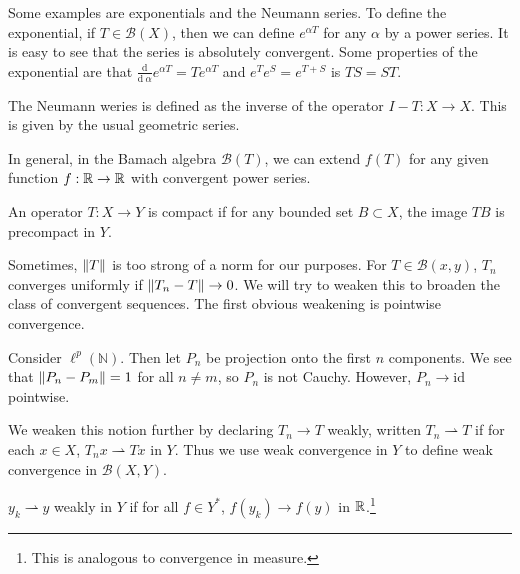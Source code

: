 \documentclass[10pt, twoside]{article}
\begin{document}
    \begin{exm}
        Some examples are exponentials and the Neumann series. To define the exponential, if $T \in \mathcal{B}(X)$, then we can define $e^{\alpha T}$ for any $\alpha$ by a power series. It is easy to see that the series is absolutely convergent. Some properties of the exponential are that $\frac{\mathrm{d}}{\mathrm{d}\ \alpha} e^{\alpha T} = T e^{\alpha T}$ and $e^T e^S = e^{T+S}$ is $TS=ST$.

        The Neumann weries is defined as the inverse of the operator $I-T: X \to X$. This is given by the usual geometric series.
    \end{exm}

    In general, in the Bamach algebra $\mathcal{B}(T)$, we can extend  $f(T)$ for any given function $f: \mathbb{R} \to \mathbb{R}$ with convergent power series.

    \begin{defn}
        An operator $T: X \to Y$ is compact if for any bounded set $B \subset X$, the image $TB$ is precompact in $Y$.
    \end{defn}

    Sometimes, $\lVert T\rVert$ is too strong of a norm for our purposes. For $T \in \mathcal{B}(x,y)$, $T_n$ converges uniformly if $\lVert T_n - T\rVert \to 0$. We will try to weaken this to broaden the class of convergent sequences. The first obvious weakening is pointwise convergence.

    \begin{exm}
        Consider $\ell^p(\mathbb{N})$. Then let $P_n$ be projection onto the first $n$ components. We see that $\lVert P_n - P_m\rVert = 1$ for all $n \neq m$, so $P_n$ is not Cauchy. However, $P_n \to \mathrm{id}$ pointwise.
    \end{exm}

    \begin{defn}
        We weaken this notion further by declaring $T_n \to T$ weakly, written $T_n \rightharpoonup T$ if for each $x \in X$, $T_nx \rightharpoonup Tx$ in $Y$. Thus we use weak convergence in $Y$ to define weak convergence in $\mathcal{B}(X,Y)$.
    \end{defn}

    \begin{defn}
        $y_k \rightharpoonup y$ weakly in $Y$ if for all $f \in Y^*$, $f(y_k) \to f(y)$ in $\mathbb{R}$.\footnote{This is analogous to convergence in measure.}
    \end{defn}
\end{document}
